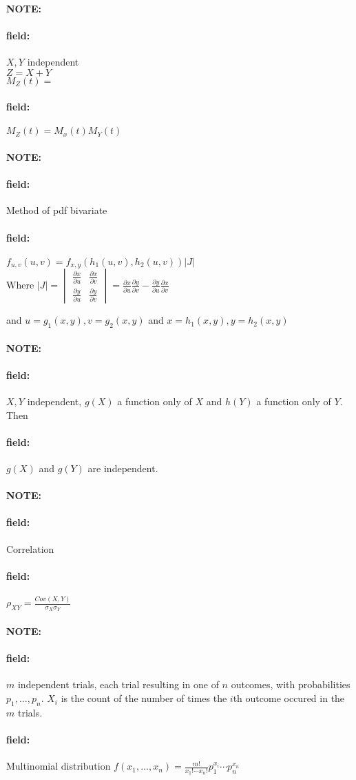 \documentclass[12pt]{article}
\newenvironment{note}{\paragraph{NOTE:}}{}
\newenvironment{field}{\paragraph{field:}}{}
\begin{document}
\begin{note}
  \begin{field}
    $X,Y$ independent\\ $Z = X + Y$  \\ $M_Z(t) = $
  \end{field}
  \begin{field}
    $M_Z(t) = M_x(t)M_Y(t)$
  \end{field}
\end{note}

\begin{note}
  \begin{field}
    Method of pdf bivariate
  \end{field}
  \begin{field}
    $f_{u,v}(u,v) = f_{x,y}(h_1(u,v),h_2(u,v))|J|$\\
    Where $|J| = \begin{vmatrix}
      \frac{\partial  x}{\partial  u} & \frac{\partial  x }{\partial v }\\ \frac{\partial  y }{\partial u } & \frac{\partial  y }{\partial v }
    \end{vmatrix} = \frac{\partial  x }{\partial u } \frac{\partial  y}{\partial v } - \frac{\partial  y }{\partial u } \frac{\partial  x }{\partial v }$

    and $u = g_1(x,y), v = g_2(x,y)$ and $x = h_1(x,y), y = h_2(x,y)$
  \end{field}
\end{note}


\begin{note}
  \begin{field}
    $X,Y$ independent, $g(X)$ a function only of $X$ and $h(Y)$ a function only of $Y$. Then
  \end{field}
  \begin{field}
    $g(X)$ and $g(Y)$ are independent.
  \end{field}
\end{note}

\begin{note}
  \begin{field}
    Correlation
  \end{field}
  \begin{field}
    $\rho_{XY} = \frac{Cov(X,Y)}{\sigma_X\sigma_Y}$
  \end{field}
\end{note}

\begin{note}
  \begin{field}
    $m$ independent trials, each trial resulting in one of $n$ outcomes, with probabilities $p_1, \ldots, p_n$. $X_i$ is the count of the number of times the $i$th outcome occured in the $m$ trials.
  \end{field}
  \begin{field}
    Multinomial distribution
    $f(x_1, \ldots, x_n) = \frac{m!}{x_1! \cdots x_n!}p_1^{x_i} \cdots p_n^{x_n}$
  \end{field}
\end{note}
\end{document}
